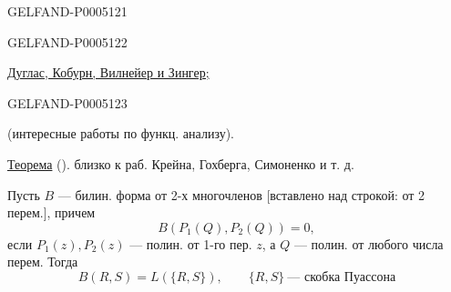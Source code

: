 \begin{GelfandAdjacentEvidence}{GELFAND-P000512}{1}
\end{GelfandAdjacentEvidence}
\begin{GelfandAdjacentEvidence}{GELFAND-P000512}{2}


\qquad{}

\quad
\uline{Дуглас, Кобурн, Вилнейер и Зингер;}\quad
{}
\end{GelfandAdjacentEvidence}
\begin{GelfandAdjacentEvidence}{GELFAND-P000512}{3}


(интересные работы по функц. анализу).

\uline{Теорема} (). близко к раб. Крейна, Гохберга, Симоненко и т. д.

Пусть $B$ — билин. форма от 2-х многочленов
[вставлено над строкой: от 2 перем.], причем
\[
B(P_1(Q),P_2(Q))=0,
\]
если $P_1(z),P_2(z)$ — полин. от 1-го пер. $z$,
а $Q$ — полин. от любого числа перем. Тогда
\[
B(R,S)=L(\{R,S\}),\qquad \{R,S\}\ \text{— скобка Пуассона}
\]
\end{GelfandAdjacentEvidence}
